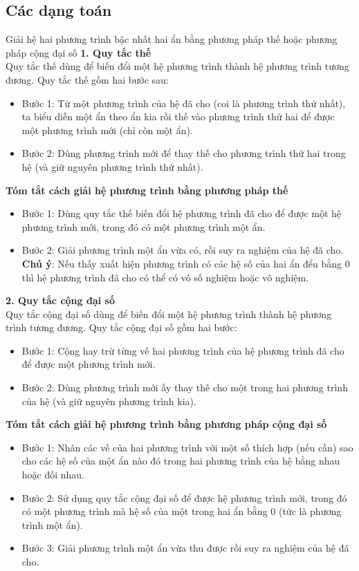 \subsection{Các dạng toán}
\begin{dang}{Giải hệ hai phương trình bậc nhất hai ẩn bằng phương pháp thế hoặc phương pháp  cộng đại số}
\textbf{1. Quy tắc thế}\\
Quy tắc thế dùng để biến đổi một hệ phương trình thành hệ phương trình tương đương. Quy tắc thế gồm hai bước sau:
\begin{itemize}
\item Bước 1: Từ một phương trình của hệ đã cho (coi là phương trình thứ nhất), ta biểu diễn một ẩn theo ẩn kia rồi thế vào phương trình thứ hai để được một phương trình mới (chỉ còn một ẩn).
\item Bước 2: Dùng phương trình mới để thay thế cho phương trình thứ hai trong hệ (và giữ nguyên phương trình thứ nhất).
\end{itemize}
\textbf{Tóm tắt cách giải hệ phương trình bằng phương pháp thế}
\begin{itemize}
\item Bước 1: Dùng quy tắc thế biến đổi hệ phương trình đã cho để được một hệ phương trình mới, trong đó có một phương trình một ẩn.
\item Bước 2: Giải phương trình một ẩn vừa có, rồi suy ra nghiệm của hệ đã cho.\\
\textbf{Chú ý}: Nếu thấy xuất hiện phương trình có các hệ số của hai ẩn đểu bằng 0 thì hệ phương trình đã cho có thể có vô số nghiệm hoặc vô nghiệm.
\end{itemize}
\textbf{2. Quy tắc cộng đại số}\\
Quy tắc cộng đại số dùng để biến đổi một hệ phương trình thành hệ phương trình tương đương. Quy tắc cộng đại số gồm hai bước:
\begin{itemize}
\item Bước 1: Cộng hay trừ từng vế hai phương trình của hệ phương trình đã cho để được một phương trình mới.
\item Bước 2: Dùng phương trình mới ấy thay thế cho một trong hai phương trình của hệ (và giữ nguyên phương trình kia).
\end{itemize}
\textbf{Tóm tắt cách giải hệ phương trình bằng phương pháp cộng đại số}
\begin{itemize}
\item Bước 1: Nhân các vế của hai phương trình với một số thích hợp (nếu cần) sao cho các hệ số của một ẩn nào đó trong hai phương trình của hệ bằng nhau hoặc đối nhau.
\item Bước 2: Sử dụng quy tắc cộng đại số để được hệ phương trình mới, trong đó có một phương trình mà hệ số của một trong hai ẩn bằng 0 (tức là phương trình một ẩn).
\item Bước 3: Giải phương trình một ẩn vừa thu được rồi suy ra nghiệm của hệ đã cho.
\end{itemize}
\end{dang}

